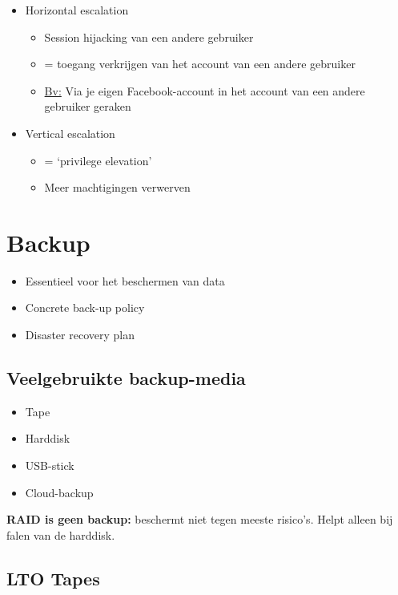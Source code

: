 \documentclass{article}
\newcommand{\bold}[1]{\textbf{#1}}
\begin{document}
\begin{itemize}
    \item Horizontal escalation
    \begin{itemize}
        \item Session hijacking van een andere gebruiker
        \item = toegang verkrijgen van het account van een andere gebruiker
        \item \underline{Bv:} Via je eigen Facebook-account in het account van een andere gebruiker geraken
    \end{itemize}
    \item Vertical escalation
    \begin{itemize}
        \item = `privilege elevation'
        \item Meer machtigingen verwerven
    \end{itemize}
\end{itemize}

\section{Backup}

\begin{itemize}
    \item Essentieel voor het beschermen van data
    \item Concrete back-up policy
    \item Disaster recovery plan
\end{itemize}

\subsection{Veelgebruikte backup-media}
\begin{itemize}
    \item Tape
    \item Harddisk
    \item USB-stick
    \item Cloud-backup
\end{itemize}

\bold{RAID is geen backup:} beschermt niet tegen meeste risico's. Helpt alleen bij falen van de harddisk. 

\subsection{LTO Tapes}
\end{document}
